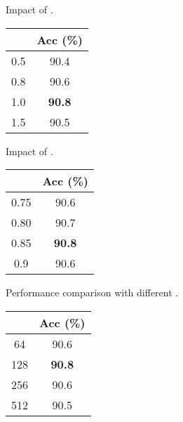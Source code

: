 \documentclass{article} \usepackage{iclr2023_conference,times}
\begin{document}
\begin{minipage}{\textwidth}
\begin{minipage}[t]{0.3\textwidth}
\centering
\setlength\tabcolsep{2pt}
\makeatletter{}
\setlength\tabcolsep{2.5pt}
   \scriptsize
   \caption{Impact of .}
    \begin{tabular}{c||c}
\rowcolor{gray!30}  & Acc (\%) \\
       \hline \hline
        0.5 & 90.4\\ 
        0.8 & 90.6 \\
        1.0 & \textbf{90.8} \\
        1.5 & 90.5 \\
        \hline
    \end{tabular}
    \label{table:tau}
\end{minipage}
\hspace{2mm}
\begin{minipage}[t]{0.3\textwidth}
\centering
\setlength\tabcolsep{2pt}
\makeatletter{}
\setlength\tabcolsep{2.5pt}
   \scriptsize
   \caption{Impact of .}
    \begin{tabular}{c||c}
\rowcolor{gray!30}  & Acc (\%) \\
       \hline \hline
        0.75 & 90.6\\ 
        0.80 & 90.7 \\
        0.85 & \textbf{90.8} \\
        0.9 & 90.6 \\
        \hline
    \end{tabular}
    \label{table:alpha}
\end{minipage}
\hspace{3mm}
\begin{minipage}[t]{0.3\textwidth}
\centering
\makeatletter{}
\setlength\tabcolsep{2.5pt}
   \scriptsize
   \caption{Performance comparison with different .}
    \begin{tabular}{c||c}
\rowcolor{gray!30}  & Acc (\%) \\
       \hline \hline
        64   & 90.6 \\
        128  & \textbf{90.8} \\
        256  & 90.6 \\
        512  & 90.5 \\\hline
    \end{tabular}
    \label{tab:K_H_plus.}
\end{minipage}


\end{minipage}
\end{document}
